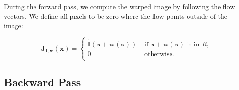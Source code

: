 \documentclass[10pt,twocolumn,letterpaper]{article}%
\begin{document}
During the forward pass, we compute the warped image by following the flow vectors. We define all pixels to be zero where the flow points outside of the image:

\begin{equation}
\mathbf{J}_{\mathbf{I},\mathbf{w}}(\mathbf{x}) = 
\begin{cases}
\tilde{\mathbf{I}}(\mathbf{x} + \mathbf{w}(\mathbf{x})) & \mbox{ if } \mathbf{x} + \mathbf{w}(\mathbf{x}) \mbox{ is in } R \mbox{,} \\
0  & \mbox{ otherwise.} \\
\end{cases} 
\end{equation} 

\subsection{Backward Pass} 
\end{document}
